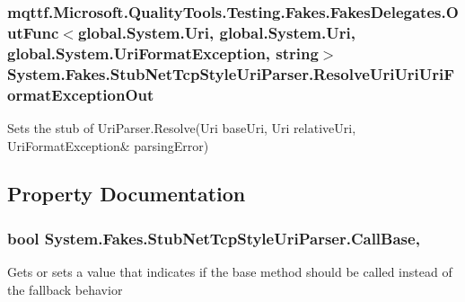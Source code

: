 \hypertarget{class_system_1_1_fakes_1_1_stub_net_tcp_style_uri_parser_ac496cc9955de43ade867b6b5b883f7fc}{
\subsubsection[{Resolve\-Uri\-Uri\-Uri\-Format\-Exception\-Out}]{\setlength{\rightskip}{0pt plus 5cm}mqttf.\-Microsoft.\-Quality\-Tools.\-Testing.\-Fakes.\-Fakes\-Delegates.\-Out\-Func$<$global.\-System.\-Uri, global.\-System.\-Uri, global.\-System.\-Uri\-Format\-Exception, string$>$ System.\-Fakes.\-Stub\-Net\-Tcp\-Style\-Uri\-Parser.\-Resolve\-Uri\-Uri\-Uri\-Format\-Exception\-Out}}\label{class_system_1_1_fakes_1_1_stub_net_tcp_style_uri_parser_ac496cc9955de43ade867b6b5b883f7fc}


Sets the stub of Uri\-Parser.\-Resolve(Uri base\-Uri, Uri relative\-Uri, Uri\-Format\-Exception\& parsing\-Error)



\subsection{Property Documentation}
\hypertarget{class_system_1_1_fakes_1_1_stub_net_tcp_style_uri_parser_a2e34c6139d1ad583a8cffe35ad784e82}{
\subsubsection[{Call\-Base}]{\setlength{\rightskip}{0pt plus 5cm}bool System.\-Fakes.\-Stub\-Net\-Tcp\-Style\-Uri\-Parser.\-Call\-Base\hspace{0.3cm}{\ttfamily [get]}, {\ttfamily [set]}}}\label{class_system_1_1_fakes_1_1_stub_net_tcp_style_uri_parser_a2e34c6139d1ad583a8cffe35ad784e82}


Gets or sets a value that indicates if the base method should be called instead of the fallback behavior

